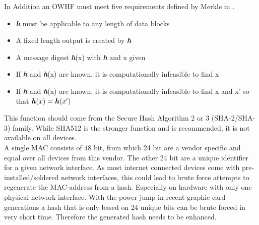         In Addition an OWHF must meet five requirements defined by Merkle in \cite{merkle_secrecy_1979}.
        \begin{itemize}
            \item \textbf{\textit{h}} must be applicable to any length of data blocks
            \item A fixed length output is created by \textbf{\textit{h}}
            \item A message digest \textbf{\textit{h}}(x) with \textbf{\textit{h}} and x given
            \item If \textbf{\textit{h}} and \textbf{\textit{h}}(x) are known, it is computationally infeasible to find x
            \item If \textbf{\textit{h}} and \textbf{\textit{h}}(x) are known, it is computationally infeasible to find x and x' so that $\textbf{\textit{h}}(x) = \textbf{\textit{h}}(x')$
        \end{itemize}
        
        This function should come from the Secure Hash Algorithm 2 or 3 (SHA-2/SHA-3) family. While SHA512 is the stronger function and is recommended, it is not available on all devices.\\
        A single MAC consists of 48 bit, from which 24 bit are a vendor specific and equal over all devices from this vendor. The other 24 bit are a unique identifier for a given network interface. As most internet connected devices come with pre-installed/soldered network interfaces, this could lead to brute force attempts to regenerate the MAC-address from a hash. Especially on hardware with only one physical network interface. With the power jump in recent graphic card generations a hash that is only based on 24 unique bits can be brute forced in very short time. Therefore the generated hash needs to be enhanced.\\
        

